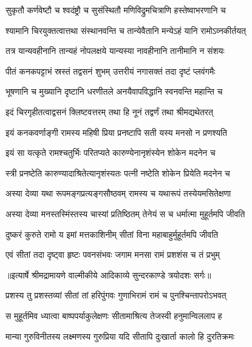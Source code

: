 \twolineshloka
{सुकृतौ कर्णवेष्टौ च श्वदंष्ट्रौ च सुसंस्थितौ}
{मणिविद्रुमचित्राणि हस्तेष्वाभरणानि च} %

\twolineshloka
{श्यामानि चिरयुक्तत्वात्तथा संस्थानवन्ति च}
{तान्येवैतानि मन्येऽहं यानि रामोऽव्नकीर्तयत्} %

\twolineshloka
{तत्र यान्यवहीनानि तान्यहं नोपलक्षये}
{यान्यस्या नावहीनानि तानीमानि न संशयः} %

\twolineshloka
{पीतं कनकपट्टाभं स्रस्तं तद्वसनं शुभम्}
{उत्तरीयं नगासक्तं तदा दृष्टं प्लवंगमैः} %

\twolineshloka
{भूषणानि च मुख्यानि दृष्टानि धरणीतले}
{अनयैवापविद्धानि स्वनवन्ति महान्ति च} %

\twolineshloka
{इदं चिरगृहीतत्वाद्वसनं क्लिष्टवत्तरम्}
{तथा हि नूनं तद्वर्णं तथा श्रीमद्यथेतरत्} %

\twolineshloka
{इयं कनकवर्णाङ्गी रामस्य महिषी प्रिया}
{प्रनष्टापि सती यस्य मनसो न प्रणश्यति} %

\twolineshloka
{इयं सा यत्कृते रामश्चतुर्भिः परितप्यते}
{कारुण्येनानृशंस्येन शोकेन मदनेन च} %

\twolineshloka
{स्त्री प्रनष्टेति कारुण्यादाश्रितेत्यानृशंस्यतः}
{पत्नी नष्टेति शोकेन प्रियेति मदनेन च} %

\twolineshloka
{अस्या देव्या यथा रूपमङ्गप्रत्यङ्गसौष्ठवम्}
{रामस्य च यथारूपं तस्येयमसितेक्षणा} %

\twolineshloka
{अस्या देव्या मनस्तस्मिंस्तस्य चास्यां प्रतिष्ठितम्}
{तेनेयं स च धर्मात्मा मुहूर्तमपि जीवति} %

\twolineshloka
{दुष्करं कुरुते रामो य इमां मत्तकाशिनीम्}
{सीतां विना महाबाहुर्मुहूर्तमपि जीवति} %

\twolineshloka
{एवं सीतां तदा दृष्ट्वा हृष्टः पवनसंभवः}
{जगाम मनसा रामं प्रशशंस च तं प्रभुम्} %


{॥इत्यार्षे श्रीमद्रामायणे वाल्मीकीये आदिकाव्ये सुन्दरकाण्डे त्रयोदशः सर्गः॥}


\twolineshloka
{प्रशस्य तु प्रशस्तव्यां सीतां तां हरिपुंगवः}
{गुणाभिरामं रामं च पुनश्चिन्तापरोऽभवत्} %

\twolineshloka
{स मुहूर्तमिव ध्यात्वा बाष्पपर्याकुलेक्षणः}
{सीतामाश्रित्य तेजस्वी हनुमान्विललाप ह} %

\twolineshloka
{मान्या गुरुविनीतस्य लक्ष्मणस्य गुरुप्रिया}
{यदि सीतापि दुःखार्ता कालो हि दुरतिक्रमः} %

